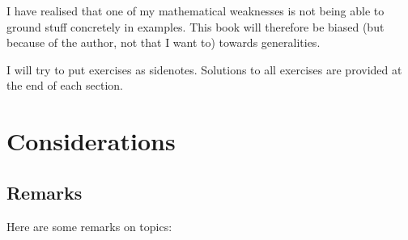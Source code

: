 \documentclass{tufte-book}
\begin{document}
I have realised that one of my mathematical weaknesses is not being able to ground stuff concretely in examples. This book will therefore be biased (but because of the author, not that I want to) towards generalities.

I will try to put exercises as sidenotes. Solutions to all exercises are provided at the end of each section.

\mainmatter

\chapter{Considerations}
\label{ch:metamathematics}

\section{Remarks}

Here are some remarks on topics:
\end{document}
